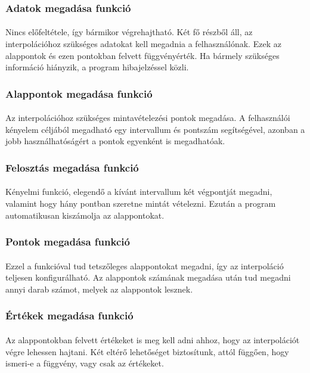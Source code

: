 \documentclass[12pt]{report}
\begin{document}
\subsubsection{Adatok megadása funkció}
\paragraph{}
Nincs előfeltétele, így bármikor végrehajtható. Két fő részből áll, az interpolációhoz szükséges adatokat kell megadnia a felhasználónak. Ezek az alappontok és ezen pontokban felvett függvényérték. Ha bármely szükséges információ hiányzik, a program hibajelzéssel közli.
\subsubsection{Alappontok megadása funkció}
\paragraph{}
Az interpolációhoz szükséges mintavételezési pontok megadása. A felhasználói kényelem céljából megadható egy intervallum és pontszám segítségével, azonban a jobb használhatóságért a pontok egyenként is megadhatóak.
\subsubsection{Felosztás megadása funkció}
\paragraph{}
Kényelmi funkció, elegendő a kívánt intervallum két végpontját megadni, valamint hogy hány pontban szeretne mintát vételezni. Ezután a program automatikusan kiszámolja az alappontokat.
\subsubsection{Pontok megadása funkció}
\paragraph{}
Ezzel a funkcióval tud tetszőleges alappontokat megadni, így az interpoláció teljesen konfigurálható. Az alappontok számának megadása után tud megadni annyi darab számot, melyek az alappontok lesznek.
\subsubsection{Értékek megadása funkció}
\paragraph{}
Az alappontokban felvett értékeket is meg kell adni ahhoz, hogy az interpolációt végre lehessen hajtani. Két eltérő lehetőséget biztosítunk, attól függően, hogy ismeri-e a függvény, vagy csak az értékeket.
\end{document}
